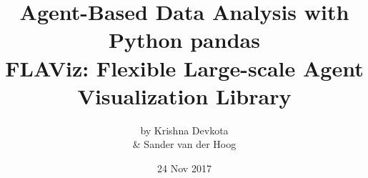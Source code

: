 \documentclass[9pt,sansserif]{beamer}
\begin{document}
\title[Agent-Based Data Analysis with Python pandas]{Agent-Based Data Analysis with Python pandas\\\bigskip FLAViz: Flexible Large-scale Agent Visualization Library}
\author[Krishna Devkota]{by Krishna Devkota\\\& Sander van der Hoog}
\date{24 Nov 2017}

\setcounter{tocdepth}{1}



\end{document}
